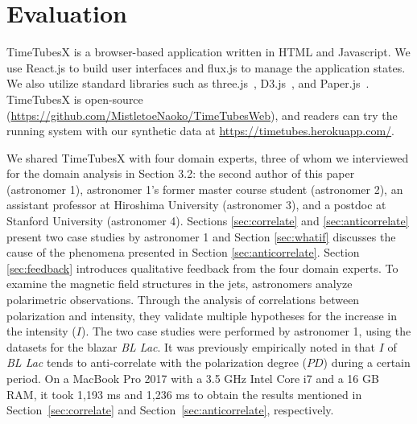 \section{Evaluation\label{sec:evaluation}}
TimeTubesX is a browser-based application written in HTML and Javascript.
We use React.js to build user interfaces and flux.js to manage the application states.
We also utilize standard libraries such as three.js~\cite{three_framework}, D3.js~\cite{d3_framework}, and Paper.js~\cite{paper_framework}.
TimeTubesX is open-source (\url{https://github.com/MistletoeNaoko/TimeTubesWeb}), and 
readers can try the running system with our synthetic data at \url{https://timetubes.herokuapp.com/}.

We shared TimeTubesX with four domain experts, three of whom we interviewed for the domain analysis in Section 3.2: the second author of this paper (astronomer 1), astronomer 1’s former master course student (astronomer 2), an assistant professor at Hiroshima University (astronomer 3), and a postdoc at Stanford University (astronomer 4). Sections \ref{sec:correlate} and \ref{sec:anticorrelate} present two case studies by astronomer 1 and Section \ref{sec:whatif} discusses the cause of the phenomena presented in Section \ref{sec:anticorrelate}. Section \ref{sec:feedback} introduces qualitative feedback from the four domain experts.
To examine the magnetic field structures in the jets, 
astronomers analyze polarimetric observations. 
Through the analysis of correlations between polarization and intensity, 
they validate multiple hypotheses for the increase in the intensity ($I$). 
The two case studies were performed by astronomer 1, using the datasets for the blazar \emph{BL Lac}. 
It was previously empirically noted in \cite{Gaur2014} that $I$ of \emph{BL Lac} tends to anti-correlate with the polarization degree ($PD$) during a certain period.
On a MacBook Pro 2017 with a 3.5 GHz Intel Core i7 and a 16 GB RAM, it took 1{,}193 ms and 1{,}236 ms to obtain the results mentioned in Section~\ref{sec:correlate} and Section~\ref{sec:anticorrelate}, respectively.
%

